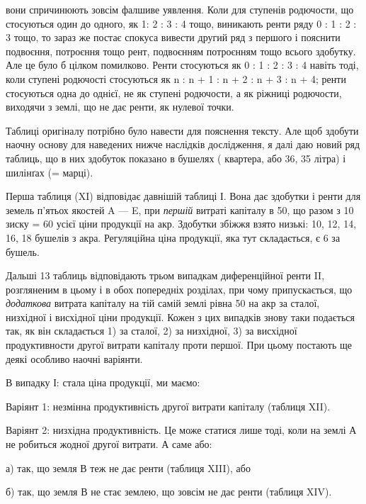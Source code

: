 \parcont{}  %
вони спричинюють зовсім фалшиве уявлення. Коли для ступенів родючости, що
стосуються один до одного, як 1: 2 : 3 : 4 тощо, виникають ренти ряду 0 : 1 : 2 : 3
тощо, то зараз же постає спокуса вивести другий ряд з першого і пояснити
подвоєння, потроєння тощо рент, подвоєнням потроєнням тощо всього здобутку.
Але це було б цілком помилково. Ренти стосуються як 0 : 1 : 2 : 3 : 4 навіть
тоді, коли ступені родючості стосуються як n : n + 1 : n + 2 : n + 3 : n + 4;
ренти стосуються одна до однієї, не як ступені родючости, а як ріжниці родючости,
виходячи з землі, що не дає ренти, як нулевої точки.

Таблиці оригіналу потрібно було навести для пояснення тексту. Але щоб
здобути наочну основу для наведених нижче наслідків дослідження, я далі
даю новий ряд таблиць, що в них здобуток показано в бушелях (  квартера,
або 36, 35 літра) і шилінґах (= марці).

Перша таблиця (XI) відповідає давнішій таблиці І. Вона дає здобутки
і ренти для земель п’ятьох якостей A — E, при \emph{першій} витраті капіталу в 50, що разом з 10 зиску = 60 усієї ціни продукції на акр. Здобутки
збіжжя взято низькі: 10, 12, 14, 16, 18 бушелів з акра. Регуляційна
ціна продукції, яка тут складається, є 6 за бушель.

Дальші 13 таблиць відповідають трьом випадкам диференційної ренти II,
розгляненим в цьому і в обох попередніх розділах, при чому припускається, що
\emph{додаткова} витрата капіталу на тій самій землі рівна 50 на акр за сталої,
низхідної і висхідної ціни продукції. Кожен з цих випадків знову таки
подається так, як він складається 1) за сталої, 2) за низхідної, 3) за висхідної
продуктивности другої витрати капіталу проти першої. При цьому постають ще
деякі особливо наочні варіянти.

В випадку І: стала ціна продукції, ми маємо:

Варіянт 1: незмінна продуктивність другої витрати капіталу (таблиця XII).

Варіянт 2: низхідна продуктивність. Це може статися лише тоді, коли на землі
А не робиться жодної другої витрати. А саме або:

а) так, що земля В теж не дає ренти (таблиця XIII), або

б) так, що земля В не стає землею, що зовсім не дає ренти (таблиця XIV).


